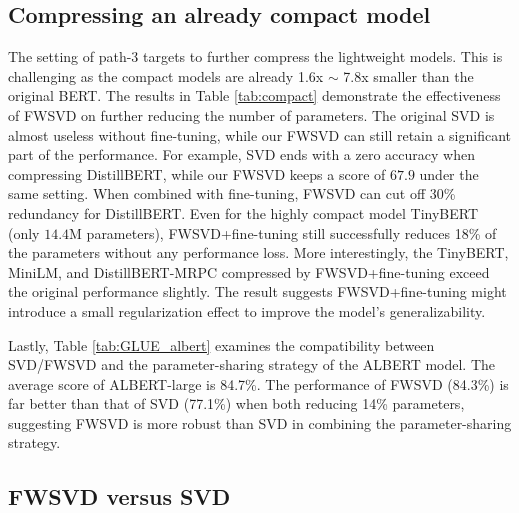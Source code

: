 


\subsection{Compressing an already compact model}\label{sec:path3}
The setting of path-3 targets to further compress the lightweight models.
This is challenging as the compact models are already 1.6x $\sim$ 7.8x smaller than the original BERT. 
The results in Table \ref{tab:compact} demonstrate the effectiveness of FWSVD on further reducing the number of parameters. 
The original SVD is almost useless without fine-tuning, while our FWSVD can still retain a significant part of the performance.
For example, SVD ends with a zero accuracy when compressing DistillBERT, while our FWSVD keeps a score of $67.9$ under the same setting.
When combined with fine-tuning, FWSVD can cut off 30\% redundancy for DistillBERT. Even for the highly compact model TinyBERT (only $14.4$M parameters),
FWSVD+fine-tuning still successfully reduces 18\% of the parameters without any performance loss. 
More interestingly, the TinyBERT, MiniLM, and DistillBERT-MRPC compressed by FWSVD+fine-tuning exceed the original performance slightly. The result suggests FWSVD+fine-tuning might introduce a small regularization effect to improve the model's generalizability. 

Lastly, Table \ref{tab:GLUE_albert} examines the compatibility between SVD/FWSVD and the parameter-sharing strategy of the ALBERT model. The average score of ALBERT-large is 84.7\%. The performance of FWSVD (84.3\%) is far better than that of SVD (77.1\%) when both reducing 14\% parameters, suggesting FWSVD is more robust than SVD in combining the parameter-sharing strategy.  





\subsection{FWSVD versus SVD}\label{sec:wsvd_vs_svd}

